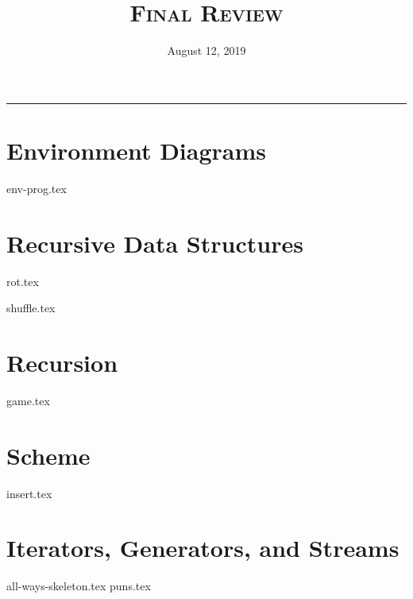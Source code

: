 \documentclass{exam}
\title{\textsc{Final Review}}
\date{August 12, 2019}
\begin{document}
\maketitle
\rule{\textwidth}{0.15em}
\fontsize{12}{15}\selectfont

\section{Environment Diagrams}
\begin{questions}
{env-prog.tex}
\end{questions}

\newpage
\section{Recursive Data Structures}
\begin{questions}
{rot.tex}

\newpage
{shuffle.tex}
\end{questions}

\newpage
\section{Recursion}
\begin{questions}
{game.tex}
\end{questions}

\newpage
\section{Scheme}
\begin{questions}
{insert.tex}
\end{questions}


\newpage
\section{Iterators, Generators, and Streams}
\begin{questions}
{all-ways-skeleton.tex}
\newpage
{puns.tex}
\end{questions}
\end{document}
